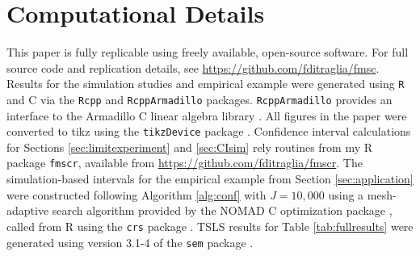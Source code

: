 \section{Computational Details}
\label{append:comp}
This paper is fully replicable using freely available, open-source software.
For full source code and replication details, see \url{https://github.com/fditraglia/fmsc}.
Results for the simulation studies and empirical example were generated using \texttt{R} \citep{R} and C\raisebox{0.5ex}{\tiny\textbf{++}} via the \texttt{Rcpp} \citep{RcppArticle,RcppBook} and \texttt{RcppArmadillo} \citep{RcppArmadillo} packages.
\texttt{RcppArmadillo} provides an interface to the Armadillo C\raisebox{0.5ex}{\tiny\textbf{++}} linear algebra library \citep{Armadillo}.
All figures in the paper were converted to tikz using the \texttt{tikzDevice} package \citep{tikzDevice}.
Confidence interval calculations for Sections \ref{sec:limitexperiment} and \ref{sec:CIsim} rely routines from my R package \texttt{fmscr}, available from \url{https://github.com/fditraglia/fmscr}.
The simulation-based intervals for the empirical example from Section \ref{sec:application} were constructed following Algorithm \ref{alg:conf} with  $J = 10,000$ using a mesh-adaptive search algorithm provided by the NOMAD C\raisebox{0.5ex}{\tiny\textbf{++}} optimization package \citep{NOMADalgorithm,NOMADcode,NOMADuserguide}, called from R using the \texttt{crs} package \citep{crs}.
TSLS results for Table \ref{tab:fullresults} were generated using version 3.1-4 of the \texttt{sem} package \citep{sem}.
